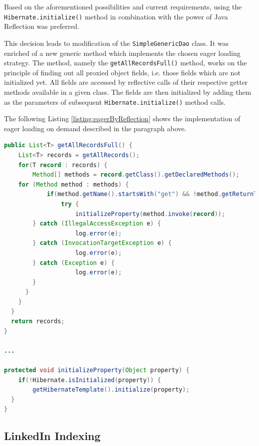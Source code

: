 Based on the aforementioned possibilities and current requirements, using the \texttt{Hibernate.initialize()} method in combination with the power of Java Reflection was preferred. 

This decision leads to modification of the \texttt{SimpleGenericDao} class. It was enriched of a new generic method which implements the chosen eager loading strategy. 
The method, namely the \texttt{getAllRecordsFull()} method, works on the principle of finding out all proxied object fields, i.e. those fields which are not initialized yet.
All fields are accessed by reflective calls of their respective getter methods available in a given class.
The fields are then initialized by adding them as the parameters of subsequent \texttt{Hibernate.initialize()} method calls.

The following Listing \ref{listing:eagerByReflection} shows the implementation of eager loading on demand described in the paragraph above.

\begin{lstlisting}[language=Java, caption={Enforcing Eager Loading by Using Java Reflection.}, label={listing:eagerByReflection}]
public List<T> getAllRecordsFull() {
	List<T> records = getAllRecords();
	for(T record : records) {
		Method[] methods = record.getClass().getDeclaredMethods();
    for (Method method : methods) {
			if(method.getName().startsWith("get") && !method.getReturnType().isPrimitive()) {
				try {
					initializeProperty(method.invoke(record));
        } catch (IllegalAccessException e) {
					log.error(e);
        } catch (InvocationTargetException e) {
					log.error(e);
        } catch (Exception e) {
					log.error(e);
        }
      }
    }
  }
  return records;
}

...

protected void initializeProperty(Object property) {
	if(!Hibernate.isInitialized(property)) {
		getHibernateTemplate().initialize(property);
  }               
}
\end{lstlisting}



\subsection{LinkedIn Indexing}


%

